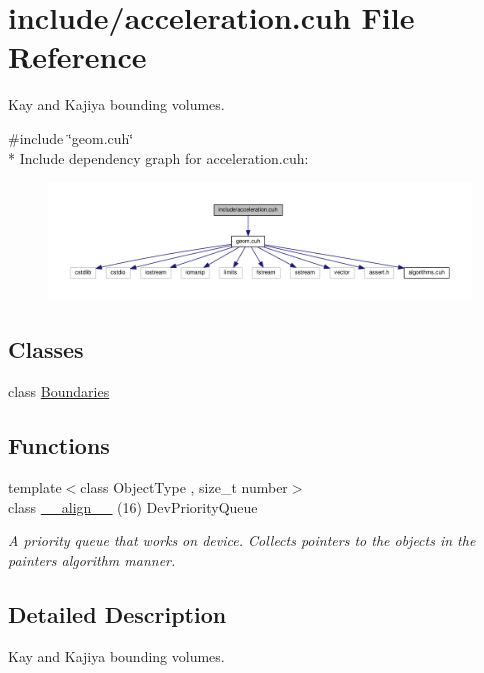 \hypertarget{cuda_tracer__0__1_2include_2acceleration_8cuh}{}\section{include/acceleration.cuh File Reference}
\label{cuda_tracer__0__1_2include_2acceleration_8cuh}


Kay and Kajiya bounding volumes.  


{\ttfamily \#include \char`\"{}geom.\+cuh\char`\"{}}\\*
Include dependency graph for acceleration.\+cuh\+:
\nopagebreak
\begin{figure}[H]
\begin{center}
\leavevmode
\includegraphics[width=350pt]{cuda_tracer__0__1_2include_2acceleration_8cuh__incl}
\end{center}
\end{figure}
\subsection*{Classes}
\begin{DoxyCompactItemize}
\item 
class \hyperlink{class_boundaries}{Boundaries}
\end{DoxyCompactItemize}
\subsection*{Functions}
\begin{DoxyCompactItemize}
\item 
{\footnotesize template$<$class Object\+Type , size\+\_\+t number$>$ }\\class \hyperlink{cuda_tracer__0__1_2include_2acceleration_8cuh_a070af818501609893fa3557d5f97d5bb}{\+\_\+\+\_\+align\+\_\+\+\_\+} (16) Dev\+Priority\+Queue\hypertarget{cuda_tracer__0__1_2include_2acceleration_8cuh_a070af818501609893fa3557d5f97d5bb}{}\label{cuda_tracer__0__1_2include_2acceleration_8cuh_a070af818501609893fa3557d5f97d5bb}

\begin{DoxyCompactList}\small\item\em A priority queue that works on device. Collects pointers to the objects in the painter\textquotesingle{}s algorithm manner. \end{DoxyCompactList}\end{DoxyCompactItemize}


\subsection{Detailed Description}
Kay and Kajiya bounding volumes. 


